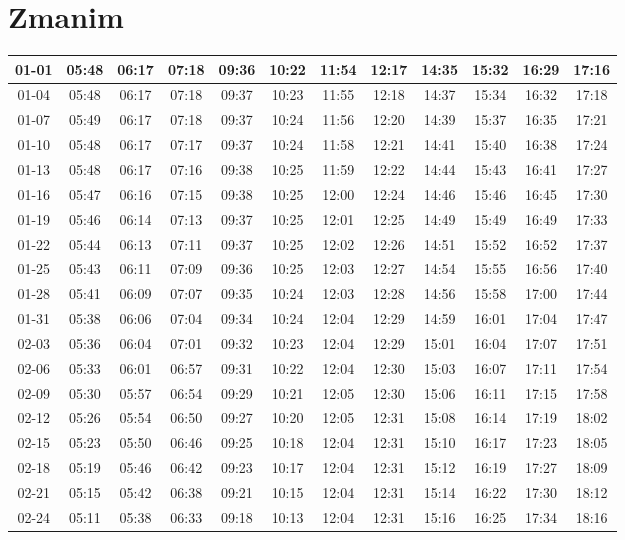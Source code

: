 \chapter{Zmanim}

\begin{footnotesize}
	\begin{tabular}{c | c | c| c| c| c| c| c| c| c| c| c}
		01-01&05:48&06:17&07:18&09:36&10:22&11:54&12:17&14:35&15:32&16:29&17:16\\\hline
		01-04&05:48&06:17&07:18&09:37&10:23&11:55&12:18&14:37&15:34&16:32&17:18\\\hline
		01-07&05:49&06:17&07:18&09:37&10:24&11:56&12:20&14:39&15:37&16:35&17:21\\\hline
		01-10&05:48&06:17&07:17&09:37&10:24&11:58&12:21&14:41&15:40&16:38&17:24\\\hline
		01-13&05:48&06:17&07:16&09:38&10:25&11:59&12:22&14:44&15:43&16:41&17:27\\\hline
		01-16&05:47&06:16&07:15&09:38&10:25&12:00&12:24&14:46&15:46&16:45&17:30\\\hline
		01-19&05:46&06:14&07:13&09:37&10:25&12:01&12:25&14:49&15:49&16:49&17:33\\\hline
		01-22&05:44&06:13&07:11&09:37&10:25&12:02&12:26&14:51&15:52&16:52&17:37\\\hline
		01-25&05:43&06:11&07:09&09:36&10:25&12:03&12:27&14:54&15:55&16:56&17:40\\\hline
		01-28&05:41&06:09&07:07&09:35&10:24&12:03&12:28&14:56&15:58&17:00&17:44\\\hline
		01-31&05:38&06:06&07:04&09:34&10:24&12:04&12:29&14:59&16:01&17:04&17:47\\\hline
		02-03&05:36&06:04&07:01&09:32&10:23&12:04&12:29&15:01&16:04&17:07&17:51\\\hline
		02-06&05:33&06:01&06:57&09:31&10:22&12:04&12:30&15:03&16:07&17:11&17:54\\\hline
		02-09&05:30&05:57&06:54&09:29&10:21&12:05&12:30&15:06&16:11&17:15&17:58\\\hline
		02-12&05:26&05:54&06:50&09:27&10:20&12:05&12:31&15:08&16:14&17:19&18:02\\\hline
		02-15&05:23&05:50&06:46&09:25&10:18&12:04&12:31&15:10&16:17&17:23&18:05\\\hline
		02-18&05:19&05:46&06:42&09:23&10:17&12:04&12:31&15:12&16:19&17:27&18:09\\\hline
		02-21&05:15&05:42&06:38&09:21&10:15&12:04&12:31&15:14&16:22&17:30&18:12\\\hline
		02-24&05:11&05:38&06:33&09:18&10:13&12:04&12:31&15:16&16:25&17:34&18:16\\\hline

\end{tabular}
\end{footnotesize}
